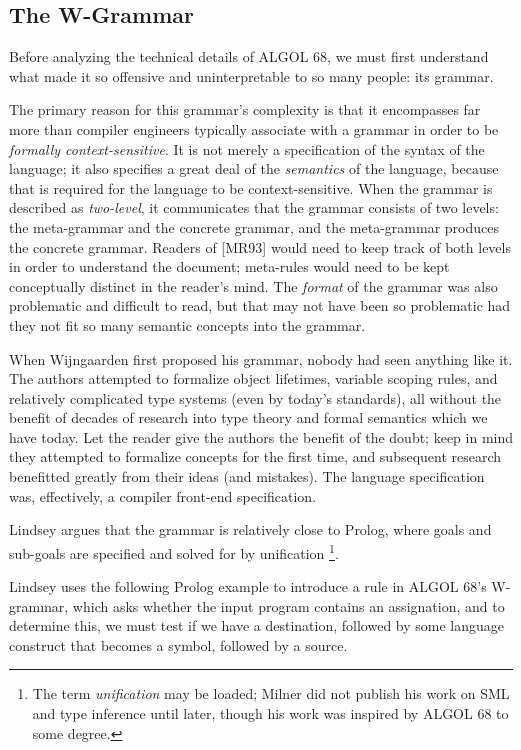 \subsection{The W-Grammar}

Before analyzing the technical details of ALGOL 68, we must first understand
what made it so offensive and uninterpretable to so many people: its grammar.

The primary reason for this grammar's complexity is that it encompasses
far more than compiler engineers typically associate with a grammar
in order to be \textit{formally context-sensitive}.
It is not merely a specification of the syntax of the language;
it also specifies a great deal of the \textit{semantics} of the language,
because that is required for the language to be context-sensitive.
When the grammar is described as \textit{two-level}, it communicates that the
grammar consists of two levels: the meta-grammar and the concrete grammar, and the
meta-grammar produces the concrete grammar.
Readers of [MR93] would need to keep track of both levels in order to understand
the document; meta-rules would need to be kept conceptually distinct in the reader's mind.
The \textit{format} of the grammar was also problematic and difficult to read,
but that may not have been so problematic had they not fit so many semantic concepts into the grammar.

When Wijngaarden first proposed his grammar, nobody had seen anything like it.
The authors attempted to formalize object lifetimes, variable scoping rules,
and relatively complicated type systems (even by today's standards), all without
the benefit of decades of research into type theory and formal semantics which
we have today.
Let the reader give the authors the benefit of the doubt; keep in mind they
attempted to formalize concepts for the first time, and subsequent research benefitted
greatly from their ideas (and mistakes).
The language specification was, effectively, a compiler front-end specification.

Lindsey argues that the grammar is relatively close to Prolog, where
goals and sub-goals are specified and solved for by unification
\footnote{The term \textit{unification} may be loaded; Milner did not publish
	his work on SML and type inference until later, though his work was inspired by
	ALGOL 68 to some degree.}.

Lindsey uses the following Prolog example to introduce a rule in ALGOL 68's W-grammar,
which asks whether the input program contains an assignation, and to determine this,
we must test if we have a destination, followed by some language construct that
becomes a symbol, followed by a source.

